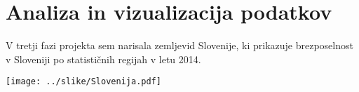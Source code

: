 \documentclass[11pt,a4paper]{article}
\begin{document}
\section{Analiza in vizualizacija podatkov}

V tretji fazi projekta sem narisala zemljevid Slovenije, ki prikazuje brezposelnost v Sloveniji po statističnih regijah v letu 2014. 

\texttt{[image: ../slike/Slovenija.pdf]}


% 
% 
\end{document}
